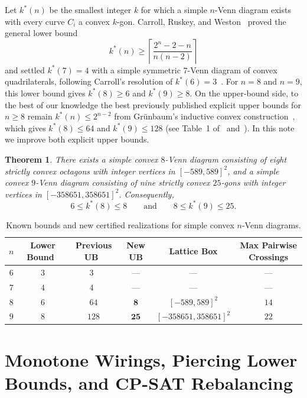 \documentclass[11pt]{article}
\newtheorem{theorem}{Theorem}
\begin{document}
Let $k^*(n)$ be the smallest integer $k$ for which a simple $n$-Venn diagram exists with every curve $C_i$ a convex $k$-gon. Carroll, Ruskey, and Weston~\cite{CRW2007} proved the general lower bound
\[
k^*(n) \ge \left\lceil \frac{2^n - 2 - n}{n(n-2)} \right\rceil
\]
and settled $k^*(7) = 4$ with a simple symmetric $7$-Venn diagram of convex quadrilaterals, following Carroll's resolution of $k^*(6) = 3$~\cite{Carroll2000}. For $n=8$ and $n=9$, this lower bound gives $k^*(8) \ge 6$ and $k^*(9) \ge 8$. On the upper-bound side, to the best of our knowledge the best previously published explicit upper bounds for $n \ge 8$ remain $k^*(n) \le 2^{n-2}$ from Gr\"unbaum's inductive convex construction~\cite{Grunbaum1975}, which gives $k^*(8) \le 64$ and $k^*(9) \le 128$ (see Table~1 of~\cite{CRW2007} and~\cite{Grunbaum1992,RuskeyWeston2005}). In this note we improve both explicit upper bounds.

\begin{theorem}\label{thm:main}
There exists a simple convex $8$-Venn diagram consisting of eight strictly convex octagons with integer vertices in $[-589, 589]^2$, and a simple convex $9$-Venn diagram consisting of nine strictly convex $25$-gons with integer vertices in $[-358651, 358651]^2$. Consequently,
\[
6 \le k^*(8) \le 8 \qquad \text{and} \qquad 8 \le k^*(9) \le 25.
\]
\end{theorem}

\begin{table}[h]
\centering
\small
\begin{tabular}{@{}cccccc@{}}
\toprule
$n$ & Lower Bound~\cite{CRW2007} & Previous UB~\cite{Grunbaum1975} & \textbf{New UB} & Lattice Box & Max Pairwise Crossings \\
\midrule
$6$ & $3$ & $3$~\cite{Carroll2000} & --- & --- & --- \\
$7$ & $4$ & $4$~\cite{CRW2007} & --- & --- & --- \\
$8$ & $6$ & $64$  & $\mathbf{8}$  & $[-589, 589]^2$       & $14$ \\
$9$ & $8$ & $128$ & $\mathbf{25}$ & $[-358651, 358651]^2$ & $22$ \\
\bottomrule
\end{tabular}
\caption{Known bounds and new certified realizations for simple convex $n$-Venn diagrams.}
\label{tab:summary}
\end{table}

\section{Monotone Wirings, Piercing Lower Bounds, and CP-SAT Rebalancing}
\end{document}
